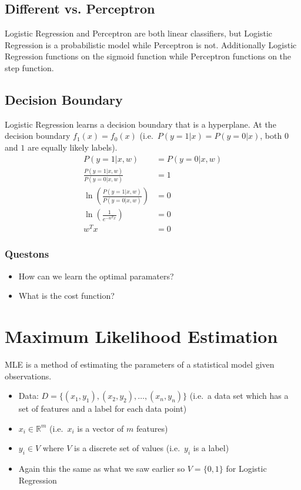 \documentclass[12pt]{article}
\begin{document}
        \subsection{Different vs. Perceptron}
            Logistic Regression and Perceptron are both linear classifiers, but Logistic Regression is a probabilistic model while Perceptron is not.
            Additionally Logistic Regression functions on the sigmoid function while Perceptron functions on the step function.
        \subsection{Decision Boundary}
            Logistic Regression learns a decision boundary that is a hyperplane.
            At the decision boundary $f_1(x) = f_0(x)$ (i.e.\ $P(y = 1 | x) = P(y = 0 | x)$, both $0$ and $1$ are equally likely labels).
            \begin{align*}
                P(y = 1 | x, w) &= P(y = 0 | x, w) \\
                \frac{P(y = 1 | x, w)}{P(y = 0 | x, w)} &= 1 \\
                \ln\left(\frac{P(y = 1 | x, w)}{P(y = 0 | x, w)}\right) &= 0 \\
                \ln\left(\frac{1}{e^{-{w^T}x}}\right) &= 0 \\
                w^T{x} &= 0
            \end{align*}
            \subsubsection{Questons}
                \begin{itemize}
                    \item How can we learn the optimal paramaters?
                    \item What is the cost function?
                \end{itemize}
    \section{Maximum Likelihood Estimation}
        MLE is a method of estimating the parameters of a statistical model given observations.
        \begin{itemize}
            \item Data: $D = \{(x_1, y_1), (x_2, y_2), \dots, (x_n, y_n)\}$ (i.e.\ a data set which has a set of features and a label for each data point)
            \item $x_i \in \mathbb{R}^m$ (i.e.\ $x_i$ is a vector of $m$ features)
            \item $y_i \in V$ where $V$ is a discrete set of values (i.e.\ $y_i$ is a label)
            \item Again this the same as what we saw earlier so $V = \{0, 1\}$ for Logistic Regression
        \end{itemize}
\end{document}
